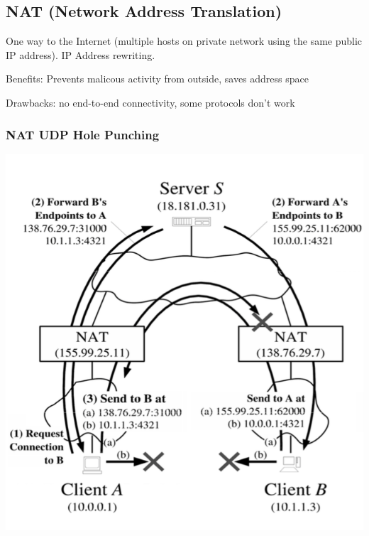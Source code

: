 \documentclass[fs, footer]{latex4ei}
\begin{document}
\begin{multicols*}{4}
{	\subsection{NAT (Network Address Translation)}
	One way to the Internet (multiple hosts on private network using the same public IP address). IP Address rewriting.

	Benefits: Prevents malicous activity from outside, saves address space

	Drawbacks: no end-to-end connectivity, some protocols don't work

	\subsubsection{NAT UDP Hole Punching}

\includegraphics[width=\columnwidth]{img/nathole.png}
}
\end{multicols*}
\end{document}
